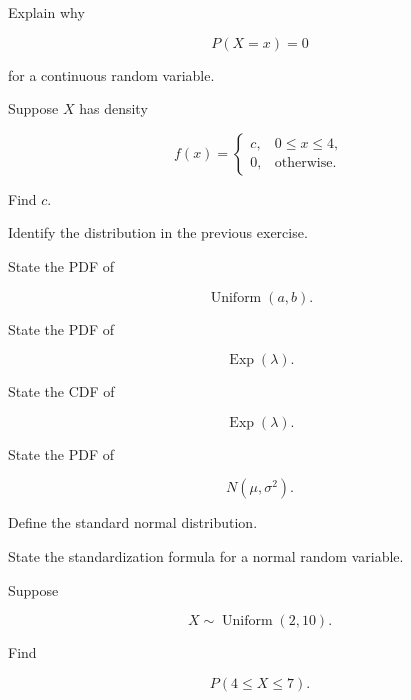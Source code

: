 \begin{exercise}[1]
Explain why

\[
P(X=x)=0
\]

for a continuous random variable.
\end{exercise}

\begin{exercise}[1]
Suppose \(X\) has density

\[
f(x)
=
\begin{cases}
c,&0\leq x\leq4,\\
0,&\text{otherwise}.
\end{cases}
\]

Find \(c\).
\end{exercise}

\begin{exercise}[1]
Identify the distribution in the previous exercise.
\end{exercise}

\begin{exercise}[1]
State the PDF of

\[
\operatorname{Uniform}(a,b).
\]
\end{exercise}

\begin{exercise}[1]
State the PDF of

\[
\operatorname{Exp}(\lambda).
\]
\end{exercise}

\begin{exercise}[1]
State the CDF of

\[
\operatorname{Exp}(\lambda).
\]
\end{exercise}

\begin{exercise}[1]
State the PDF of

\[
N(\mu,\sigma^2).
\]
\end{exercise}

\begin{exercise}[1]
Define the standard normal distribution.
\end{exercise}

\begin{exercise}[1]
State the standardization formula for a normal random variable.
\end{exercise}

\begin{exercise}[2]
Suppose

\[
X\sim\operatorname{Uniform}(2,10).
\]

Find

\[
P(4\leq X\leq7).
\]
\end{exercise}

